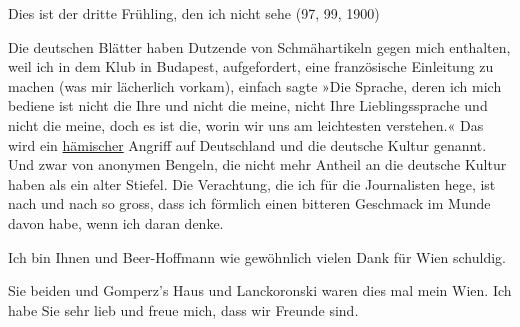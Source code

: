 \pstart
           Dies ist der dritte Frühling, den ich nicht sehe (97, 99,
                  1900)\pend
           
\pstart
           Die deutschen Blätter haben Dutzende von Schmähartikeln gegen mich enthalten, weil
               ich in dem Klub in Budapest,
               aufgefordert, eine französische Einleitung zu
               machen (was mir lächerlich vorkam), einfach sagte »Die Sprache, deren ich mich
               bediene ist nicht die Ihre und nicht die meine, nicht Ihre Lieblingssprache und nicht
               die meine, doch es ist die, worin wir uns am leichtesten verstehen.« Das wird ein \uline{hämischer} Angriff auf Deutschland und die deutsche Kultur genannt. Und zwar von anonymen Bengeln,
               die nicht mehr Antheil an die deutsche Kultur haben als ein alter Stiefel. Die Verachtung, die ich für die Journalisten {\pb}hege, ist nach und nach so gross,
               dass ich förmlich einen bitteren Geschmack im Munde davon habe, wenn ich daran
               denke.\pend
           
\pstart
           Ich bin Ihnen und Beer-Hoffmann wie gewöhnlich
               vielen Dank für Wien schuldig.\pend
           
\pstart
           Sie beiden und Gomperz’s Haus und Lanckoronski waren dies mal mein Wien. Ich habe Sie sehr lieb und freue mich, dass
               wir Freunde sind.\pend
           
